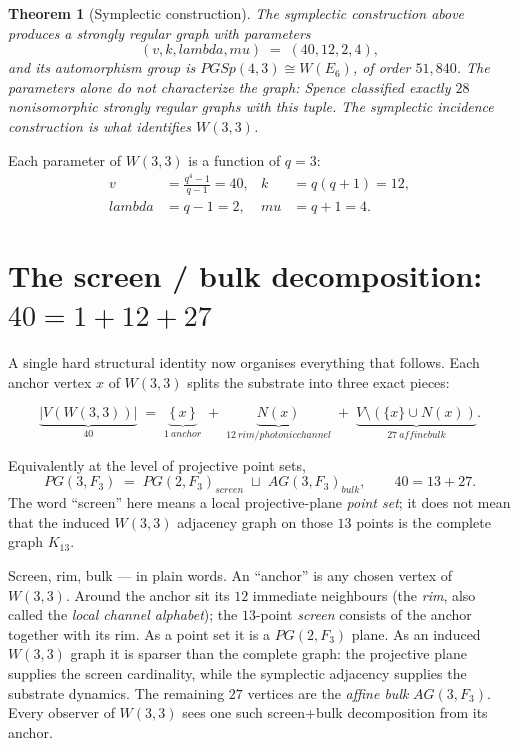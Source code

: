 \documentclass[11pt]{article}
\def\mathbb#1{#1}%
\def\mathrm#1{#1}%
\def\textbf#1{#1}%
\def\text#1{#1}%
\def\lambda{lambda}%
\def\mu{mu}%
\newtheorem*{theorem}{Theorem}
\newcommand{\W}{W(3,3)}
\newcommand{\PGSp}{\mathrm{PGSp}}
\begin{document}
\begin{theorem}[Symplectic construction]
The symplectic construction above produces a strongly regular graph with parameters
\[
(v, k, \lambda, \mu) \;=\; (40, 12, 2, 4),
\]
and its automorphism group is $\PGSp(4,3)\cong W(E_6)$, of order $51{,}840$.  The parameters alone do \emph{not} characterize the graph: Spence classified exactly $28$ nonisomorphic strongly regular graphs with this tuple.  The symplectic incidence construction is what identifies $\W$.
\end{theorem}

\begin{mathnote}
Each parameter of $\W$ is a function of $q = 3$:
\begin{align*}
v &= \tfrac{q^4 - 1}{q - 1} = 40, &
k &= q(q + 1) = 12, \\
\lambda &= q - 1 = 2, &
\mu &= q + 1 = 4.
\end{align*}
\end{mathnote}

\section{\texorpdfstring{The screen / bulk decomposition: $40 = 1 + 12 + 27$}{The screen / bulk decomposition: 40 = 1 + 12 + 27}}

\label{sec:screen-bulk-decomposition}

A single hard structural identity now organises everything that follows. Each anchor vertex $x$ of $W(3,3)$ splits the substrate into three exact pieces:

\[
\boxed{\;\underbrace{|V(W(3,3))|}_{40}
\;=\;
\underbrace{\{\,x\,\}}_{1\ \text{anchor}}
\;+\;
\underbrace{N(x)}_{12\ \text{rim / photonic channel}}
\;+\;
\underbrace{V\setminus(\{x\}\cup N(x))}_{27\ \text{affine bulk}}.\;}
\]

Equivalently at the level of projective point sets,
\[
\mathrm{PG}(3,\mathbb{F}_3)
\;=\;
\mathrm{PG}(2,\mathbb{F}_3)_{\text{screen}}
\;\sqcup\;
\mathrm{AG}(3,\mathbb{F}_3)_{\text{bulk}},
\qquad 40 = 13 + 27.
\]
The word ``screen'' here means a local projective-plane \emph{point set}; it does not mean that the induced $W(3,3)$ adjacency graph on those $13$ points is the complete graph $K_{13}$.

\begin{mathnote}
\textbf{Screen, rim, bulk --- in plain words.} An ``anchor'' is any chosen vertex of $W(3,3)$. Around the anchor sit its $12$ immediate neighbours (the \emph{rim}, also called the \emph{local channel alphabet}); the $13$-point \emph{screen} consists of the anchor together with its rim. As a point set it is a $\mathrm{PG}(2,\mathbb{F}_3)$ plane. As an induced $W(3,3)$ graph it is sparser than the complete graph: the projective plane supplies the screen cardinality, while the symplectic adjacency supplies the substrate dynamics. The remaining $27$ vertices are the \emph{affine bulk} $\mathrm{AG}(3,\mathbb{F}_3)$. Every observer of $W(3,3)$ sees one such screen+bulk decomposition from its anchor.
\end{mathnote}
\end{document}
